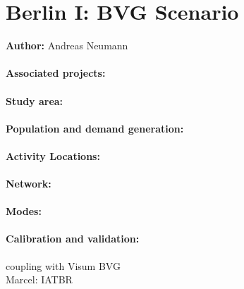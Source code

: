 \section{Berlin I: BVG Scenario}
\label{ch:scenarios:berlinI}
\hfill \textbf{Author:} Andreas Neumann

\citep[][p.67ff]{Balmer_PhDThesis_2007}

\citep[][Ch 7/8]{Neumann_PhDThesis_2014}

\paragraph{Associated projects:}

\paragraph{Study area:}

\paragraph{Population and demand generation:}

\paragraph{Activity Locations:}

\paragraph{Network:}

\paragraph{Modes:}

\paragraph{Calibration and validation:}


coupling with Visum BVG \\
Marcel: IATBR \\


